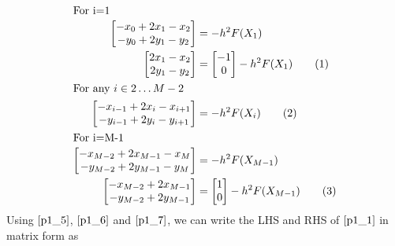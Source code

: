 \documentclass[twoside,12pt]{article}
\newcommand\numberthis{\addtocounter{equation}{1}\tag{\theequation}}
\begin{document}
\begin{align*}
\intertext{For i=1}
\begin{bmatrix}-x_{0}+2 x_1 -x_{2}\\-y_{0}+2 y_1 -y_{2}
 \end{bmatrix} &=  - h^2F(X_1)\\
\begin{bmatrix}2 x_1 -x_{2}\\2 y_1 -y_{2}
 \end{bmatrix} &= \begin{bmatrix}-1\\0\end{bmatrix} - h^2 F(X_1) \numberthis\label{p1_5}
 \\
\intertext{For any $i \in 2\dots M-2$}
\begin{bmatrix}-x_{i-1}+2 x_i -x_{i+1}\\-y_{i-1}+2 y_i -y_{i+1}
 \end{bmatrix} &= - h^2F(X_i)\numberthis\label{p1_6}
\\
\intertext{For i=M-1}
\begin{bmatrix}-x_{M-2}+2 x_{M-1} -x_{M}\\-y_{M-2}+2 y_{M-1} -y_{M}
 \end{bmatrix} &= - h^2F(X_{M-1})\\
\begin{bmatrix}-x_{M-2} + 2 x_{M-1} \\-y_{M-2} + 2 y_{M-1} 
 \end{bmatrix} &= \begin{bmatrix}1\\0\end{bmatrix} -  h^2 F(X_{M-1})\numberthis\label{p1_7}
\end{align*}
Using $\eqref{p1_5}$, $\eqref{p1_6}$ and $\eqref{p1_7}$, we can write the LHS and RHS of $\eqref{p1_1}$ in matrix form as 
\end{document}
